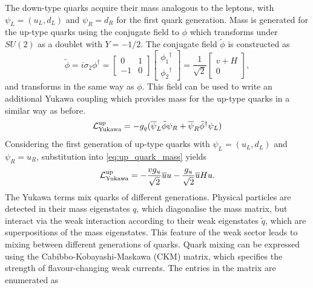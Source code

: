 The down-type quarks acquire their mass analogous to the leptons, with $\psi_L = (u_L, d_L)$ and $\psi_R = d_R$ for the first quark generation.
Mass is generated for the up-type quarks using the conjugate field to $\phi$ which transforms under $SU(2)$ as a doublet with $Y = -1/2$.
The conjugate field $\tilde{\phi}$ is constructed as
%
\begin{equation}\label{phi c field definition}
    \tilde{\phi} = 
    i \sigma_2 \phi^\dagger = 
    \begin{bmatrix}
    0 & 1 \\ -1 & 0
    \end{bmatrix} 
    \begin{bmatrix}
    {\phi_1}^\dagger \\ {\phi_2}^\dagger
    \end{bmatrix} =
    \frac{1}{\sqrt{2}}\begin{bmatrix}
      v + H \\ 0
    \end{bmatrix}
    ,
\end{equation}
%
and transforms in the same way as $\phi$. 
This field can be used to write an additional Yukawa coupling which provides mass for the up-type quarks in a similar way as before.
%
\begin{equation}\label{eq:up_quark_mass}
  \mathcal{L}_{\textnormal{Yukawa}}^{\textnormal{up}} = 
  - g_q (\overline{\psi}_L \tilde{\phi} \psi_R + \overline{\psi}_R \tilde{\phi}^\dagger \psi_L)
\end{equation}
%
Considering the first generation of up-type quarks with $\psi_L = (u_L, d_L)$ and $\psi_R = u_R$, substitution into \cref{eq:up_quark_mass} yields 
%
\begin{equation}
  \mathcal{L}_{\textnormal{Yukawa}}^{\textnormal{up}} = 
  - \frac{v g_u}{\sqrt{2}} \overline{u} u
  - \frac{g_u}{\sqrt{2}} \overline{u} H u .
\end{equation}
%
The Yukawa terms mix quarks of different generations.
Physical particles are detected in their mass eigenstates $q$, which diagonalise the mass matrix, but interact via the weak interaction according to their weak eigenstates $\tilde{q}$, which are superpositions of the mass eigenstates.
This feature of the weak sector leads to mixing between different generations of quarks.
Quark mixing can be expressed using the Cabibbo-Kobayashi-Maskawa (CKM) matrix, which specifies the strength of flavour-changing weak currents.
The entries in the matrix are enumerated as
